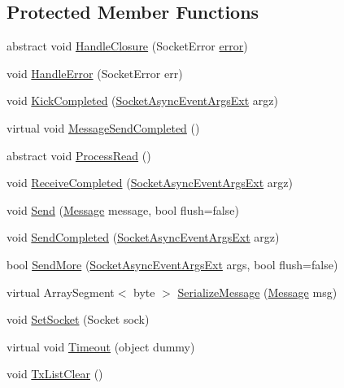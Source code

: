 \subsection*{Protected Member Functions}
\begin{DoxyCompactItemize}
\item 
abstract void \hyperlink{classOTA_1_1Sockets_1_1Connection_a977bcd34679c9b4530e8bed4b77b1a70}{Handle\+Closure} (Socket\+Error \hyperlink{classOTA_1_1Sockets_1_1Connection_a92dad899cc7fec5f17e847448f03a8ac}{error})
\item 
void \hyperlink{classOTA_1_1Sockets_1_1Connection_ab573c7230b4214b5437ab337c3b105a2}{Handle\+Error} (Socket\+Error err)
\item 
void \hyperlink{classOTA_1_1Sockets_1_1Connection_a7b08b4dd5a31ba9d162a2e299831cbf3}{Kick\+Completed} (\hyperlink{classOTA_1_1Sockets_1_1Connection_1_1SocketAsyncEventArgsExt}{Socket\+Async\+Event\+Args\+Ext} argz)
\item 
virtual void \hyperlink{classOTA_1_1Sockets_1_1Connection_a38120604444a7207eccc33e2bcfac3bf}{Message\+Send\+Completed} ()
\item 
abstract void \hyperlink{classOTA_1_1Sockets_1_1Connection_a5f0e04a5c0f403cbe4449c419a55a87b}{Process\+Read} ()
\item 
void \hyperlink{classOTA_1_1Sockets_1_1Connection_afbcb0bc12e2746fd7d07ab7c3d8c40e1}{Receive\+Completed} (\hyperlink{classOTA_1_1Sockets_1_1Connection_1_1SocketAsyncEventArgsExt}{Socket\+Async\+Event\+Args\+Ext} argz)
\item 
void \hyperlink{classOTA_1_1Sockets_1_1Connection_a8521034d55fd4f45724352f024f842b3}{Send} (\hyperlink{structOTA_1_1Sockets_1_1Connection_1_1Message}{Message} message, bool flush=false)
\item 
void \hyperlink{classOTA_1_1Sockets_1_1Connection_ad46b65f999756cb3055869fdd67a9fc9}{Send\+Completed} (\hyperlink{classOTA_1_1Sockets_1_1Connection_1_1SocketAsyncEventArgsExt}{Socket\+Async\+Event\+Args\+Ext} argz)
\item 
bool \hyperlink{classOTA_1_1Sockets_1_1Connection_ac423595306cd6734497a56c87e727dfa}{Send\+More} (\hyperlink{classOTA_1_1Sockets_1_1Connection_1_1SocketAsyncEventArgsExt}{Socket\+Async\+Event\+Args\+Ext} args, bool flush=false)
\item 
virtual Array\+Segment$<$ byte $>$ \hyperlink{classOTA_1_1Sockets_1_1Connection_a89cf4183b659a7d6e11510575468c8b2}{Serialize\+Message} (\hyperlink{structOTA_1_1Sockets_1_1Connection_1_1Message}{Message} msg)
\item 
void \hyperlink{classOTA_1_1Sockets_1_1Connection_a73ee3b9726bca36c37f1f618715277be}{Set\+Socket} (Socket sock)
\item 
virtual void \hyperlink{classOTA_1_1Sockets_1_1Connection_ad43da0a928a6dc5e05311dfb797e6363}{Timeout} (object dummy)
\item 
void \hyperlink{classOTA_1_1Sockets_1_1Connection_af61ba029b99655429c5e077e8db2123e}{Tx\+List\+Clear} ()
\end{DoxyCompactItemize}
